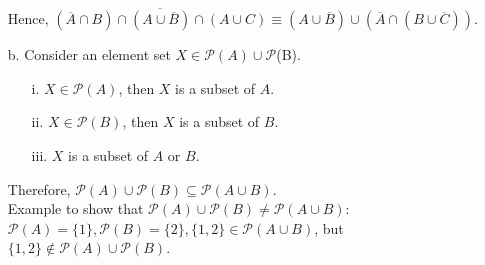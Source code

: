 \documentclass{article}
\begin{document}
\begin{enumerate}
        Hence, $\overline{(\overline{A} \cap B) \cap (A \cup \overline{B}) \cap (A \cup C)} \equiv (A \cup \overline{B}) \cup (\overline{A} \cap (B \cup \overline{C}))$.
    \item[b.] Consider an element set $X \in \mathcal{P}(A) \cup \mathcal{P}$(B).
        \begin{enumerate}
            \item[i.] $X \in \mathcal{P}(A)$, then $X$ is a subset of $A$.
            \item[ii.] $X \in \mathcal{P}(B)$, then $X$ is a subset of $B$.
            \item[iii.] $X$ is a subset of $A$ or $B$.
        \end{enumerate}
        Therefore, $\mathcal{P}(A) \cup \mathcal{P}(B) \subseteq \mathcal{P}(A\cup B)$.\\
        Example to show that $\mathcal{P}(A) \cup \mathcal{P}(B) \neq \mathcal{P}(A\cup B)$: $\mathcal{P}(A) = \{1\}, \mathcal{P}(B) = \{2\}, \{1,2\} \in \mathcal{P}(A\cup B)$, but $\{1,2\} \notin \mathcal{P}(A) \cup \mathcal{P}(B)$.
\end{enumerate}
\end{document}
